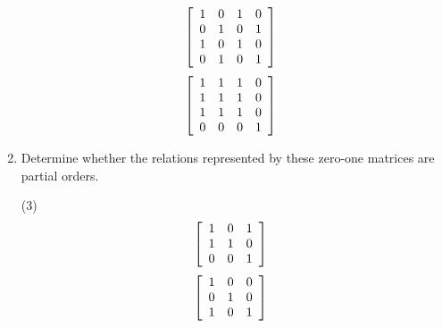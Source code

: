 \documentclass[letterpaper, 12pt]{article}
\begin{document}
\begin{enumerate}
\begin{center}
\begin{varwidth}{\textwidth}
\begin{tasks}[label=(\alph*), label-width=1.5em, item-indent=2em, ref=(\alph*),label-offset=0em]
\begin{align*}
            &\left[
            \begin{array}{c c c c}
             	1 & 0 & 1 & 0\\
             	0 & 1 & 0 & 1\\
             	1 & 0 & 1 & 0\\
             	0 & 1 & 0 & 1
        	\end{array}
            \right]&
        \end{align*}
        \task
        \begin{align*}
            &\left[
            \begin{array}{c c c c}
             	1 & 1 & 1 & 0\\
             	1 & 1 & 1 & 0\\
             	1 & 1 & 1 & 0\\
             	0 & 0 & 0 & 1
        	\end{array}
            \right]&
        \end{align*}
    \end{tasks}
    \end{varwidth}
    \end{center}
    \item Determine whether the relations represented by these zero-one matrices are partial orders.
    \begin{center}
    \begin{varwidth}{\textwidth}
    \begin{tasks}[label=(\alph*), label-width=1.5em, item-indent=2em, ref=(\alph*),label-offset=0em](3)
        \task
        \begin{align*}
            &\left[
            \begin{array}{c c c}
             	1 & 0 & 1\\
             	1 & 1 & 0\\
             	0 & 0 & 1
        	\end{array}
            \right]&
        \end{align*}
        \task
        \begin{align*}
            &\left[
            \begin{array}{c c c}
             	1 & 0 & 0\\
             	0 & 1 & 0\\
             	1 & 0 & 1
        	\end{array}
            \right]&
        \end{align*}
        \task
        \begin{align*}

\end{align*}
\end{tasks}
\end{varwidth}
\end{center}
\end{enumerate}
\end{document}
